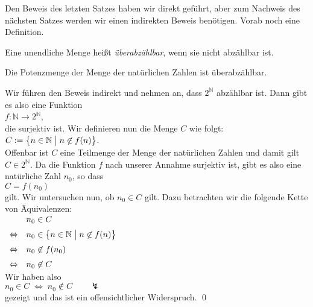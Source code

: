 Den Beweis des letzten Satzes haben wir direkt geführt, aber zum Nachweis des nächsten Satzes werden wir
einen indirekten Beweis benötigen.  Vorab noch eine Definition.

\begin{Definition}[Überabzählbar] \lb
Eine unendliche Menge heißt \emph{überabzählbar}, wenn sie nicht abzählbar ist.
\end{Definition}

\begin{Satz}
  Die Potenzmenge der Menge der natürlichen Zahlen ist überabzählbar.
\end{Satz}

\proof
Wir führen den Beweis indirekt und nehmen an, dass $2^{\mathbb{N}}$ abzählbar ist.  Dann gibt es also
eine Funktion
\\[0.2cm]
\hspace*{1.3cm}
$f: \mathbb{N} \rightarrow 2^{\mathbb{N}}$,
\\[0.2cm]
die surjektiv ist.  Wir definieren nun die Menge $C$ wie folgt:
\\[0.2cm]
\hspace*{1.3cm}
$C := \bigl\{ n \in \mathbb{N} \bigm| n \not\in f(n) \bigr\}$.
\\[0.2cm]
Offenbar ist $C$ eine Teilmenge der Menge der natürlichen Zahlen und damit gilt $C \in 2^{\mathbb{N}}$.
Da die Funktion $f$ nach unserer Annahme surjektiv ist, gibt es also eine natürliche Zahl $n_0$, so
dass 
\\[0.2cm]
\hspace*{1.3cm}
$C = f(n_0)$
\\[0.2cm]
gilt.  Wir untersuchen nun, ob $n_0 \in C$ gilt.  Dazu betrachten wir die folgende Kette von
Äquivalenzen: 
\\[-0.2cm]
\hspace*{1.3cm}
$
\begin{array}[t]{cl}
                & n_0 \in C                                                      \\[0.2cm]
\Leftrightarrow & n_0 \in \bigl\{ n \in \mathbb{N} \bigm| n \not\in f(n) \bigr\} \\[0.2cm]
\Leftrightarrow & n_0 \not\in f(n_0)                                             \\[0.2cm]
\Leftrightarrow & n_0 \not\in C                                               
\end{array}
$
\\[0.2cm]
Wir haben also
\\[0.2cm]
\hspace*{1.3cm}
$n_0 \in C \;\Leftrightarrow\; n_0 \not\in C \qquad \lightning$
\\[0.2cm]
gezeigt und das ist ein offensichtlicher Widerspruch. \qed

